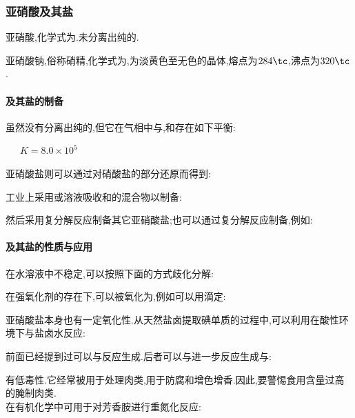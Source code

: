 \documentclass{ctexart}
\begin{document}
\subsubsection{亚硝酸及其盐}
\begin{substance}[\ce{HNO2}]
    亚硝酸,化学式为.未分离出纯的.
\end{substance}
\begin{substance}[\ce{NaNO2}]
    亚硝酸钠,俗称硝精,化学式为,为淡黄色至无色的晶体,熔点为$284\tc$,沸点为$320\tc$.
\end{substance}
\paragraph{及其盐的制备}
虽然没有分离出纯的,但它在气相中与,和存在如下平衡:
\begin{center}
    \ \ \ $K=8.0\times10^5$
\end{center}
亚硝酸盐则可以通过对硝酸盐的部分还原而得到:
\begin{center}
\end{center}
工业上采用或溶液吸收和的混合物以制备:
\begin{center}
\end{center}
然后采用复分解反应制备其它亚硝酸盐;也可以通过复分解反应制备,例如:
\begin{center}
\end{center}
\paragraph{及其盐的性质与应用}
在水溶液中不稳定,可以按照下面的方式歧化分解:
\begin{center}
\end{center}
在强氧化剂的存在下,可以被氧化为,例如可以用滴定:
\begin{center}
\end{center}
亚硝酸盐本身也有一定氧化性.从天然盐卤提取碘单质的过程中,可以利用在酸性环境下与盐卤水反应:
\begin{center}
\end{center}
前面已经提到过可以与反应生成.后者可以与进一步反应生成与:
\begin{center}
\end{center}
\indent {}有低毒性.它经常被用于处理肉类,用于防腐和增色增香.因此,要警惕食用含量过高的腌制肉类.\\
\indent {}在有机化学中可用于对芳香胺进行重氮化反应:
\begin{center}
\end{center}
\end{document}
